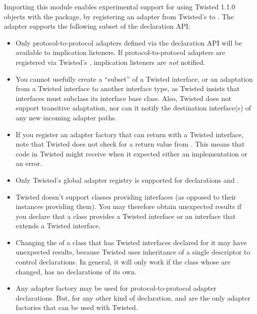 \begin{verbatim%
}
\begin{verbatim%
}
\begin{verbatim%
}
\begin{verbatim%
}
\begin{verbatim%
}
\begin{verbatim%
}
Importing this module enables experimental support for using Twisted 1.1.0
 objects with the  package, by registering
an adapter from Twisted's  to .  The
adapter supports the following subset of the declaration API:

\begin{itemize}

\item Only protocol-to-protocol adapters defined via the 
declaration API will be available to implication listeners.  If
protocol-to-protocol adapters are registered via Twisted's
, implication listeners are \emph{not} notified.

\item You cannot usefully create a ``subset'' of a Twisted interface, or an
adaptation from a Twisted interface to another interface type, as Twisted
insists that interfaces must subclass its interface base class.  Also, Twisted
does not support transitive adaptation, nor can it notify the destination
interface(s) of any new incoming adapter paths.

\item If you register an adapter factory that can return  with
a Twisted interface, note that Twisted does not check for a  return
value from .  This means that code in Twisted might
receive  when it expected either an implementation or an error.

\item Only Twisted's global adapter registry is supported for declarations and
.

\item Twisted doesn't support classes providing interfaces (as opposed to their
instances providing them).  You may therefore obtain unexpected results if you
declare that a class provides a Twisted interface or an interface that extends a
Twisted interface.

\item Changing the  of a class that has Twisted interfaces
declared for it may have unexpected results, because Twisted uses inheritance of
a single descriptor to control declarations.  In general, it will only work if
the class whose  are changed, has no declarations of its own.



\item Any adapter factory may be used for protocol-to-protocol adapter
declarations.  But, for any other kind of declaration,
 and  are the only
adapter factories that can be used with Twisted.


\end{itemize}
\end{verbatim%
}
\end{verbatim%
}
\end{verbatim%
}
\end{verbatim%
}
\end{verbatim%
}
\end{verbatim%
}
